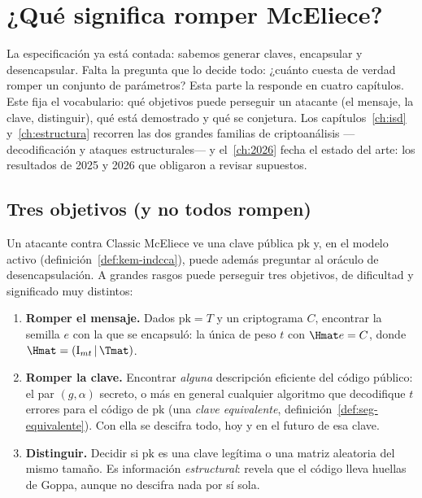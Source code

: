 \chapter{¿Qué significa romper McEliece?}\label{ch:seguridad}

\begin{roadmap}
La especificación ya está contada: sabemos generar claves, encapsular
y desencapsular. Falta la pregunta que lo decide todo: ¿cuánto cuesta
de verdad romper un conjunto de parámetros? Esta parte la responde en
cuatro capítulos. Este fija el vocabulario: qué objetivos puede
perseguir un atacante (el mensaje, la clave, distinguir), qué está
demostrado y qué se conjetura. Los capítulos~\ref{ch:isd}
y~\ref{ch:estructura} recorren las dos grandes familias de
criptoanálisis ---decodificación y ataques estructurales--- y
el~\ref{ch:2026} fecha el estado del arte: los resultados de 2025 y
2026 que obligaron a revisar supuestos.
\end{roadmap}

\section{Tres objetivos (y no todos rompen)}

Un atacante contra Classic McEliece ve una clave pública
$\mathrm{pk}$ y, en el modelo activo
(definición~\ref{def:kem-indcca}), puede además preguntar al oráculo de
desencapsulación. A grandes rasgos puede perseguir tres objetivos, de
dificultad y significado muy distintos:

\begin{enumerate}[leftmargin=1.7em,itemsep=3pt]
  \item \textbf{Romper el mensaje.} Dados $\mathrm{pk}=T$ y un
        criptograma $C$, encontrar la semilla $e$ con la que se
        encapsuló: la única de peso $t$ con $\Hmat e=C$, donde
        $\Hmat=(\mathrm{I}_{mt}\,|\,\Tmat)$.
  \item \textbf{Romper la clave.} Encontrar \emph{alguna} descripción
        eficiente del código público: el par $(g,\alpha)$ secreto, o
        más en general cualquier algoritmo que decodifique $t$
        errores para el código de $\mathrm{pk}$ (una \emph{clave
        equivalente}, definición~\ref{def:seg-equivalente}). Con ella
        se descifra todo, hoy y en el futuro de esa clave.
  \item \textbf{Distinguir.} Decidir si $\mathrm{pk}$ es una clave
        legítima o una matriz aleatoria del mismo tamaño. Es
        información \emph{estructural}: revela que el código lleva
        huellas de Goppa, aunque no descifra nada por sí sola.
\end{enumerate}

